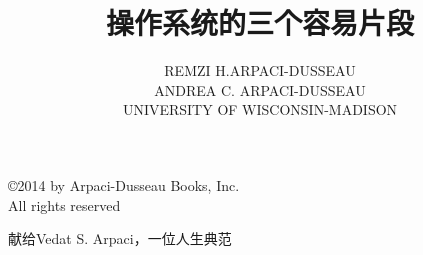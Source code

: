 \documentclass[a4paper,12pt]{book}
\begin{document}
\frontmatter
\title{操作系统的三个容易片段}
\author{REMZI H.ARPACI-DUSSEAU \\
	ANDREA C. ARPACI-DUSSEAU \\
	UNIVERSITY OF WISCONSIN-MADISON}
\maketitle
\thispagestyle{empty}%
\null
\newpage
% 
\begin{dedication}
	\copyright{}2014 by Arpaci-Dusseau Books, Inc.\\
	All rights reserved
\end{dedication}
\begin{dedication}
	献给Vedat S. Arpaci，一位人生典范
\end{dedication}

\setcounter{page}{1}

\tableofcontents
\listoffigures
\listoftables

\mainmatter



\backmatter
\printindex
\printindex[crux]
\end{document}
